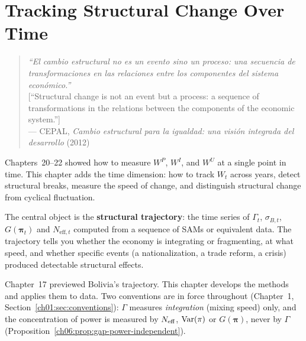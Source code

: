 \documentclass[../structural_economics_book.tex]{subfiles}
\begin{document}
\ifSubfilesClassLoaded{\setcounter{chapter}{22}}{}
\chapter{Tracking Structural Change Over Time}\label{ch:23}
\begin{quote}
\textit{``El cambio estructural no es un evento sino un proceso: una secuencia de transformaciones en las relaciones entre los componentes del sistema econ\'{o}mico.''}\\[0.3em]
\textnormal{[``Structural change is not an event but a process: a sequence of transformations in the relations between the components of the economic system.'']}\\
\hfill --- CEPAL, \textit{Cambio estructural para la igualdad: una visi\'{o}n integrada del desarrollo} (2012)
\end{quote}
\nocite{cepal2012cambio}

\vspace{1em}

Chapters~20--22 showed how to measure $W^P$, $W^I$, and $W^U$ at a single point in time. This chapter adds the time dimension: how to track $W_t$ across years, detect structural breaks, measure the speed of change, and distinguish structural change from cyclical fluctuation.

The central object is the \textbf{structural trajectory}: the time series of $\Gamma_t$, $\sigma_{B,t}$, $G(\boldsymbol{\pi}_t)$ and $N_{\text{eff},t}$ computed from a sequence of SAMs or equivalent data. The trajectory tells you whether the economy is integrating or fragmenting, at what speed, and whether specific events (a nationalization, a trade reform, a crisis) produced detectable structural effects.

Chapter~17 previewed Bolivia's trajectory. This chapter develops the methods and applies them to data. Two conventions are in force throughout (Chapter~1, Section~\ref{ch01:sec:conventions}): $\Gamma$ measures \emph{integration} (mixing speed) only, and the concentration of power is measured by $N_{\text{eff}}$, $\operatorname{Var}(\pi)$ or $G(\boldsymbol{\pi})$, never by $\Gamma$ (Proposition~\ref{ch06:prop:gap-power-independent}).
\end{document}

